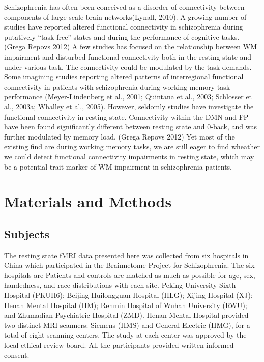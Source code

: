 \documentclass[preprint,authoryear,review,12pt]{elsarticle}
\begin{document}
Schizophrenia has often been conceived as a disorder of connectivity between components of large-scale brain networks(Lynall, 2010). A growing number of studies have reported altered functional connectivity in schizophrenia during putatively “task-free” states and during the performance of cognitive tasks. (Grega Repovs 2012)  A few studies has focused on the relationship between WM impairment and disturbed functional connectivity both in the resting state and under various task. The connectivity could be modulated by the task demands. Some imagining studies reporting altered patterns of interregional functional connectivity in patients with schizophrenia during working memory task performance (Meyer-Lindenberg et al., 2001; Quintana et al., 2003; Schlosser et al., 2003a; Whalley et al., 2005). However, seldomly studies have investigate the functional connectivity in resting state. Connectivity within the DMN and FP have been found significantly different between resting state and 0-back, and was further modulated by memory load. (Grega Repovs 2012) Yet most of the existing find are during working memory tasks, we are still eager to find wheather we could detect functional connectivity impairments in resting state, which may be a potential trait marker of WM impairment in schizophrenia patients.

\section*{Materials and Methods}

\subsection*{Subjects}

The resting state fMRI data presented here was collected from six hospitals in China which participated in the Brainnetome Project for Schizophrenia. The six hospitals are  Patients and controls are matched as much as possible for age, sex, handedness, and race distributions with each site. Peking University Sixth Hospital (PKUH6); Beijing Huilongguan Hospital (HLG); Xijing Hospital (XJ); Henan Mental Hospital (HM);  Renmin Hospital of Wuhan University (RWU); and Zhumadian Psychiatric Hospital (ZMD). Henan Mental Hospital provided two distinct MRI scanners: Siemens (HMS) and General Electric (HMG), for a total of eight scanning centers. The study at each center was approved by the local ethical review board. All the participants provided written informed consent.
\end{document}
